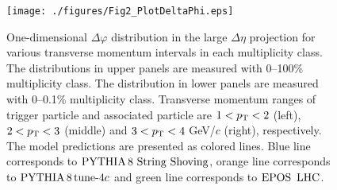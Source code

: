 \begin{figure}[h!]
	\centering
	\texttt{[image: ./figures/Fig2\_PlotDeltaPhi.eps]}
	\caption{One-dimensional $\Delta\varphi$ distribution in the large $\Delta\eta$ projection for various transverse momentum intervals in each multiplicity class. The distributions in upper panels are measured with 0--100\% multiplicity class. The distribution in lower panels are measured with 0--0.1\% multiplicity class. Transverse momentum ranges of trigger particle and associated particle are $1<p_\mathrm{T}<2$ (left), $2<p_\mathrm{T}<3$ (middle) and $3<p_\mathrm{T}<4$ GeV/$c$ (right), respectively. The model predictions are presented as colored lines. Blue line corresponds to ${\mathrm{PYTHIA}\,8~\mathrm{String}~}\mathrm{Shoving}$, orange line corresponds to $\mathrm{PYTHIA}\,8\,\mathrm{tune}{\text -}4c$ and green line corresponds to ${\mathrm{EPOS}\,~\mathrm{LHC}}$.}
	\label{fig:PlotDeltaPhi}
\end{figure}
 
